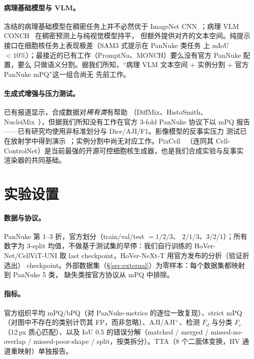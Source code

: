 \documentclass[11pt]{article}
\begin{document}
\paragraph{病理基础模型与 VLM。}冻结的病理基础模型在稠密任务上并不必然优于 ImageNet
CNN~\cite{mindthegap}；病理 VLM CONCH~\cite{lu2024conch} 在稠密预测上与纯视觉模型持平，
但额外提供对齐的文本空间。纯提示接口在细胞核任务上表现极差（SAM3 式提示在 PanNuke 类任务
上 mIoU $<10\%$）；最接近的已有工作（PromptNu、MONCH）要么没有官方 PanNuke 配置，要么
只做语义分割。据我们所知，“病理 VLM 文本空间 + 实例分割 + 官方 PanNuke mPQ”这一组合尚无
先前工作。

\paragraph{生成式增强与压力测试。}已有报道显示，合成数据对\emph{稀有类}有帮助
（DiffMix、HistoSmith、NucleiMix~\cite{nucleimix}），但据我们所知没有工作在官方 3-fold
PanNuke 协议下以 mPQ 报告——已有研究均使用非标准划分与 Dice/AJI/F1。影像模型的反事实压力
测试已在放射学中得到演示~\cite{cfstress}；实例分割中尚无对应工作。PixCell~\cite{le2025pixcell}
（连同其 Cell-ControlNet）是当前最强的开源可控细胞核生成器，也是我们合成实验与反事实
渲染器的共同基础。

\section{实验设置}
\label{sec:setup}

\paragraph{数据与协议。}PanNuke 第 1--3 折，官方划分（train/val/test $=1/2/3$、
$2/1/3$、$3/2/1$）；所有数字为 3-split 均值，不做基于测试集的早停：我们自行训练的
HoVer-Net/CellViT-UNI 取 last checkpoint，HoVer-NeXt-T 用官方发布的分折（验证折选出）
checkpoint。外部数据集（\S\ref{sec:external}）为零样本：每个数据集都映射到 PanNuke 5 类，
缺失类按官方协议从 mPQ 中排除。

\paragraph{指标。}官方组织平均 mPQ/bPQ（对 PanNuke-metrics 的逐位一致复现）、strict mPQ
（对图中不存在的类别计罚其 FP，而非忽略）、AJI/AJI$^+$、检测 $F_d$ 与分类 $F_c$（12\,px
质心匹配）、以及 IoU 0.5 的错误分解（matched / merged / missed-no-overlap /
missed-poor-shape / split，按类拆分）。TTA（8 个二面体变换，HV 通道重映射）单独报告。
\end{document}
